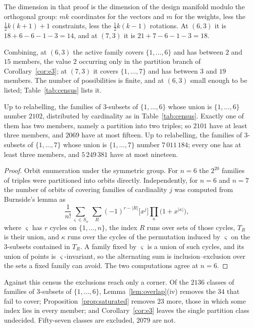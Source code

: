 The dimension in that proof is the dimension of the design manifold
modulo the orthogonal group: $mk$ coordinates for the vectors and $m$ for
the weights, less the $\tfrac12k(k+1)+1$ constraints, less the
$\tfrac12k(k-1)$ rotations.  At $(6,3)$ it is $18+6-6-1-3=14$, and at
$(7,3)$ it is $21+7-6-1-3=18$.

Combining, at $(6,3)$ the active family covers $\{1,\dots,6\}$ and has
between $2$ and $15$ members, the value $2$ occurring only in the
partition branch of Corollary~\ref{cor:e3}; at $(7,3)$ it covers
$\{1,\dots,7\}$ and has between $3$ and $19$ members.  The number of
possibilities is finite, and at $(6,3)$ small enough to be listed;
Table~\ref{tab:census} lists it.

\begin{proposition}\label{prop:census}
Up to relabelling, the families of $3$-subsets of $\{1,\dots,6\}$ whose
union is $\{1,\dots,6\}$ number $2102$, distributed by cardinality as in
Table~\ref{tab:census}.  Exactly one of them has two members, namely a
partition into two triples; so $2101$ have at least three members, and
$2069$ have at most fifteen.  Up to relabelling, the families of
$3$-subsets of $\{1,\dots,7\}$ whose union is $\{1,\dots,7\}$ number
$7\,011\,184$; every one has at least three members, and $5\,249\,381$
have at most nineteen.
\end{proposition}

\begin{proof}
Orbit enumeration under the symmetric group.  For $n=6$ the $2^{20}$
families of triples were partitioned into orbits directly.  Independently,
for $n=6$ and $n=7$ the number of orbits of covering families of
cardinality $j$ was computed from Burnside's lemma as
\[
  \frac1{n!}\sum_{\varsigma\in S_n}\ \sum_{R}(-1)^{r-\lvert R\rvert}
    \bigl[x^{j}\bigr]\!\!\prod_{\kappa}
      \bigl(1+x^{\lvert\kappa\rvert}\bigr),
\]
where $\varsigma$ has $r$ cycles on $\{1,\dots,n\}$, the index $R$ runs over
sets of those cycles, $T_R$ is their union, and $\kappa$ runs over the
cycles of the permutation induced by $\varsigma$ on the $3$-subsets contained
in $T_R$.  A family fixed by $\varsigma$ is a union of such cycles, and its
union of points is $\varsigma$-invariant, so the alternating sum is
inclusion--exclusion over the sets a fixed family can avoid.  The two
computations agree at $n=6$.
\end{proof}

Against this census the exclusions reach only a corner.  Of the $2136$
classes of families of $3$-subsets of $\{1,\dots,6\}$,
Lemma~\ref{lem:overlap}(iv) removes the $34$ that fail to cover;
Proposition~\ref{prop:saturated} removes $23$ more, those in which some
index lies in every member; and Corollary~\ref{cor:e3} leaves the single
partition class undecided.  Fifty-seven classes are excluded, $2079$ are
not.

